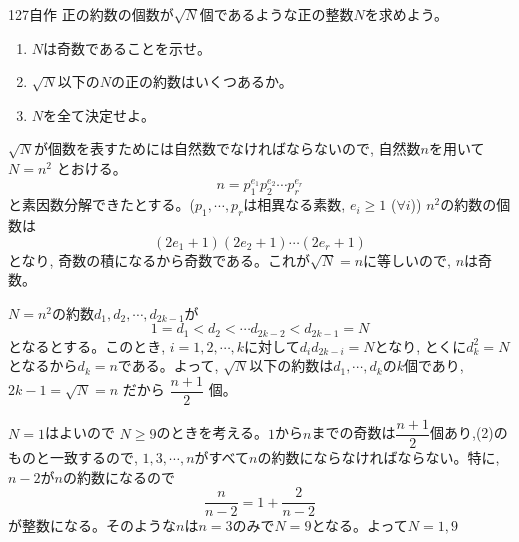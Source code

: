\begin{prob}{127}{}{自作}
 正の約数の個数が$\sqrt{N}$個であるような正の整数$N$を求めよう。
 \begin{enumerate}
  \item $N$は奇数であることを示せ。
  \item $\sqrt{N}$以下の$N$の正の約数はいくつあるか。
  \item $N$を全て決定せよ。
 \end{enumerate}
\end{prob}

$\sqrt{N}$が個数を表すためには自然数でなければならないので,  自然数$n$を用いて $N=n^2$ とおける。
\[n=p_1^{e_1}p_2^{e_2}\cdots p_r^{e_r}\]
と素因数分解できたとする。($p_1, \cdots, p_r$は相異なる素数, $e_i\geq 1$ ($\forall i$)) $n^2$の約数の個数は
\[(2e_1+1)(2e_2+1)\cdots (2e_r +1)\]
となり, 奇数の積になるから奇数である。これが$\sqrt{N}=n$に等しいので, $n$は奇数。

$N=n^2$の約数$d_1,d_2,\cdots, d_{2k-1}$が
\[1=d_1<d_2<\cdots d_{2k-2}<d_{2k-1}=N\]
となるとする。このとき, $i=1,2,\cdots ,k$に対して$d_id_{2k-i}=N$となり, とくに$d_k^2=N$となるから$d_k=n$である。よって, $\sqrt{N}$以下の約数は$d_1,\cdots, d_k$の$k$個であり, $2k-1=\sqrt{N}=n$ だから $\dfrac{n+1}{2}$ 個。

$N=1$はよいので $N\geq 9$のときを考える。$1$から$n$までの奇数は$\dfrac{n+1}{2}$個あり,(2)のものと一致するので, $1,3,\cdots, n$がすべて$n$の約数にならなければならない。特に, $n-2$が$n$の約数になるので
\[\dfrac{n}{n-2}=1+\dfrac{2}{n-2}\]
が整数になる。そのような$n$は$n=3$のみで$N=9$となる。よって$N=1,9$

